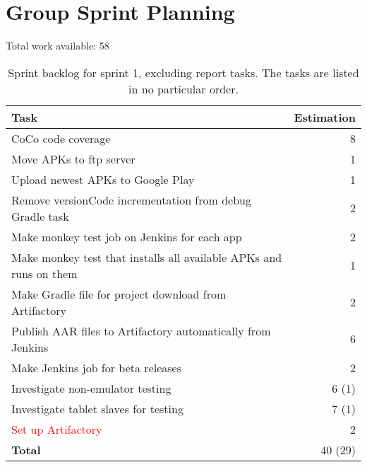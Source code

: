 \section{Group Sprint Planning}
Total work available: 58

\begin{table}[htp]%
  \centering
  \begin{tabular}{lr}
    \toprule
    \textbf{Task} & \textbf{Estimation} \\
    \midrule
    CoCo code coverage & 8 \\
    Move APKs to ftp server & 1 \\
    Upload newest APKs to Google Play & 1 \\
    Remove versionCode incrementation from debug Gradle task & 2 \\
    Make monkey test job on Jenkins for each app & 2 \\
    Make monkey test that installs all available APKs and runs on them & 1 \\
    Make Gradle file for project download from Artifactory & 2 \\
    Publish AAR files to Artifactory automatically from Jenkins & 6 \\
    Make Jenkins job for beta releases & 2 \\
    Investigate non-emulator testing & 6 (1) \\
    Investigate tablet slaves for testing & 7 (1) \\
    \textcolor{red}{Set up Artifactory} & 2 \\
    \midrule
    \textbf{Total} & 40 (29) \\
    \bottomrule
  \end{tabular}
\caption{Sprint backlog for sprint 1, excluding report tasks. The tasks are listed in no particular order.}
\label{tab:sprint1_tasks}
\end{table}




